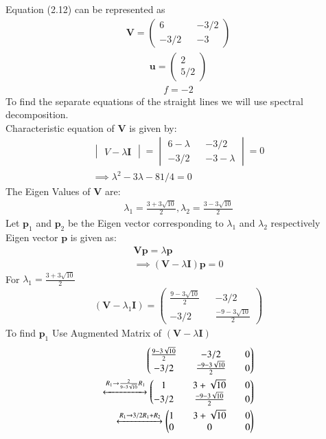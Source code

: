 \documentclass[journal,13pt,twocolumn]{IEEEtran}
\newcommand{\myvec}[1]{\ensuremath{\begin{pmatrix}#1\end{pmatrix}}}
\newcommand{\mydet}[1]{\ensuremath{\begin{vmatrix}#1\end{vmatrix}}}
\renewcommand{\vec}[1]{\mathbf{#1}}
\begin{document}
Equation (2.12) can be represented as 
\begin{align}
\vec{V}=\myvec{6 && -3/2\\ -3/2 && -3}
\end{align}
\begin{align}
\vec{u}=\myvec{2\\5/2}
\end{align}
\begin{align}
f= -2
\end{align}
To find the separate equations of the straight lines we will use spectral decomposition.\\
Characteristic equation of $\vec{V}$ is given by:
\begin{align}
\mydet{V-\lambda \vec{I}}=\mydet{6-\lambda && -3/2\\ -3/2 && -3-\lambda} = 0\\
\implies \lambda^2 - 3\lambda - 81/4 = 0
\end{align}
The Eigen Values of $\vec{V}$ are:
\begin{align}
\lambda_1 = \frac{3+3\sqrt{10}}{2}, \lambda_2 = \frac{3-3\sqrt{10}}{2}
\end{align}
Let $\vec{p}_1$ and $\vec{p}_2$ be the Eigen vector corresponding to $\lambda_1$ and $\lambda_2$ respectively\\
Eigen vector $\vec{p}$ is given as:
\begin{align}
\vec{V}\vec{p} = \lambda\vec{p}\\
\implies (\vec{V} - \lambda \vec{I})\vec{p} = 0
\end{align}
For $\lambda_1 = \frac{3+3\sqrt{10}}{2}$
\begin{align}
(\vec{V} - \lambda_1 \vec{I}) = \myvec{\frac{9-3\sqrt{10}}{2} && -3/2\\ -3/2 && \frac{-9-3\sqrt{10}}{2}}
\end{align}
To find $ \vec{p}_1 $ Use Augmented Matrix of $(\vec{V} - \lambda \vec{I})$
\begin{align}
 \myvec{\frac{9-3\sqrt{10}}{2} && -3/2 && 0\\ -3/2 && \frac{-9-3\sqrt{10}}{2} && 0}\\
\xleftrightarrow[]{R_1\rightarrow \frac{2}{9-3\sqrt{10}}R_1} 
\myvec{1 && 3+\sqrt{10} && 0\\ -3/2 && \frac{-9-3\sqrt{10}}{2} && 0}\\
\xleftrightarrow[]{R_1\rightarrow 3/2R_1+R_2} 
\myvec{1 && 3+\sqrt{10} && 0\\ 0 && 0 && 0} 
\end{align}
\end{document}
